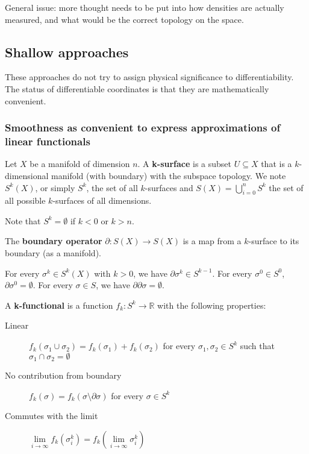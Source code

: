 \documentclass[10pt, onecolumn, longbibliography, nofootinbib]{revtex4-2}
\begin{document}
General issue: more thought needs to be put into how densities are actually measured, and what would be the correct topology on the space.

\subsection{Shallow approaches}

These approaches do not try to assign physical significance to differentiability. The status of differentiable coordinates is that they are mathematically convenient.

\subsubsection{Smoothness as convenient to express approximations of linear functionals}

\begin{defn}
	Let $X$ be a manifold of dimension $n$. A \textbf{k-surface} is a subset $U \subseteq X$ that is a $k$-dimensional manifold (with boundary) with the subspace topology. We note $S^k(X)$, or simply $S^k$, the set of all $k$-surfaces and $S(X) = \bigcup_{i=0}^{n} S^k$ the set of all possible $k$-surfaces of all dimensions.
\end{defn}

\begin{remark}
	Note that $S^k = \emptyset$ if $k < 0$ or $k > n$.
\end{remark}

\begin{defn}
	The \textbf{boundary operator} $\partial : S(X) \to S(X)$ is a map from a $k$-surface to its boundary (as a manifold).
\end{defn}

\begin{prop}
	For every $\sigma^k \in S^k(X)$ with $k > 0$, we have $\partial \sigma^k \in S^{k-1}$. For every $\sigma^0 \in S^0$, $\partial \sigma^0 = \emptyset$. For every $\sigma \in S$, we have $\partial \partial \sigma = \emptyset$.
\end{prop}

\begin{defn}
	A \textbf{k-functional} is a function $f_k : S^k \to \mathbb{R}$ with the following properties:
	\begin{description}
		\item[Linear] $f_k(\sigma_1 \cup \sigma_2) = f_k(\sigma_1) + f_k(\sigma_2)$ for every $\sigma_1, \sigma_2 \in S^k$ such that $\sigma_1 \cap \sigma_2 = \emptyset$
		\item[No contribution from boundary] $f_k(\sigma) = f_k(\sigma \setminus \partial \sigma)$ for every $\sigma \in S^k$
		\item[Commutes with the limit] $\lim\limits_{i \to \infty} f_k(\sigma_i^k) = f_k(\lim\limits_{i \to \infty}\sigma_i^k)$
	\end{description}
\end{defn}
\end{document}
